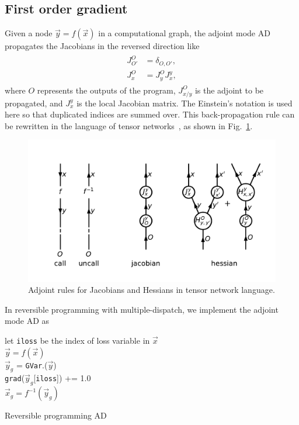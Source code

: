 \documentclass[aps,twocolumn,longbibliography,english,superscriptaddress]{revtex4-1}
\newcommand{\<}{\langle}
\renewcommand{\>}{\rangle}
\newcommand{\out}{{O}}
\newcommand{\vx}{{\vec x}}
\newcommand{\vy}{{\vec y}}
\newcommand{\grad}{{\texttt{grad}}}
\newcommand{\Fig}[1]{Fig.~\ref{#1}}
\theoremstyle{definition}\newtheorem{definition}{\textit{Definition}}
\begin{document}
\subsection{First order gradient}\label{sec:jacobian}
Given a node $\vec y = f(\vec x)$ in a computational graph,
the adjoint mode AD propagates the Jacobians in the reversed direction like
\begin{align}
    \begin{split}
        J^{\out}_{\out'} &= \delta_{\out,\out'},\\
        J^{\out}_{x} &= J^{\out}_{y} J^{y}_{x},
    \end{split}
\end{align}
where $\out$ represents the outputs of the program, $J^{\out}_{x/y}$ is the adjoint to be propagated, and $J^{y}_x$ is the local Jacobian matrix. The Einstein's notation is used here so that duplicated indices are summed over.
This back-propagation rule can be rewritten in the language of tensor networks~\cite{Orus2014}, as shown in \Fig{fig:ad}.
\begin{figure}
    \centerline{\includegraphics[width=0.9\columnwidth,trim={0.5cm 1cm 0 1cm},clip]{images/ad.pdf}}
    \caption{Adjoint rules for Jacobians and Hessians in tensor network language.}\label{fig:ad}
\end{figure}

In reversible programming with multiple-dispatch, we implement the adjoint mode AD as

\begin{algorithm}[H]
    \KwResult{\grad.($\vx_g$)}
    let \texttt{iloss} be the index of loss variable in $\vx$\\
    $\vy = f(\vx)$\\
    $\vy_g$ = \texttt{GVar}.($\vy$)\\
    \grad($\vy_g$[\texttt{iloss}]) += 1.0\\
    $\vx_g= f^{-1}(\vy_g)$
    \caption{Reversible programming AD}\label{alg:ad}
\end{algorithm}
\end{document}

